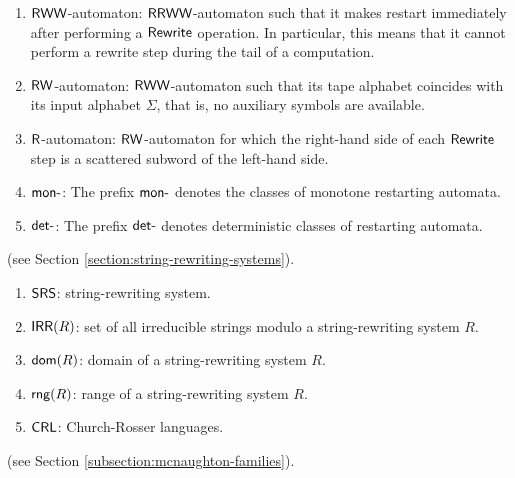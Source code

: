 \begin{enumerate}[]
\item $\textup{\sf RWW}$-automaton: $\textup{\sf RRWW}$-automaton such that it makes restart immediately after performing a $\textup{\sf Rewrite}$ operation. In particular, this means that it cannot perform a rewrite step during the tail of a computation.
\item $\textup{\sf RW}$-automaton: $\textup{\sf RWW}$-automaton such that its tape alphabet coincides with its input alphabet $\Sigma$, that is, no auxiliary symbols are available.
\item $\textup{\sf R}$-automaton: $\textup{\sf RW}$-automaton for which the right-hand side of each $\textup{\sf Rewrite}$ step is a scattered subword of the left-hand side.
\item $\textup{\sf mon-}$: The prefix $\textup{\sf mon-}$ denotes the classes of monotone restarting automata.
\item $\textup{\sf det-}$: The prefix $\textup{\sf det-}$ denotes deterministic classes of restarting automata.
\end{enumerate}

 (see Section \ref{section:string-rewriting-systems}).

\begin{enumerate}[]
\item $\textup{\sf SRS}$: string-rewriting system.
\item $\textup{\sf IRR}(R)$: set of all irreducible strings modulo a string-rewriting system $R$.
\item $\textup{\sf dom}(R)$: domain of a string-rewriting system $R$.
\item $\textup{\sf rng}(R)$: range of a string-rewriting system $R$.
\item $\textup{\sf CRL}$: Church-Rosser languages.
\end{enumerate}

 (see Section \ref{subsection:mcnaughton-families}).

